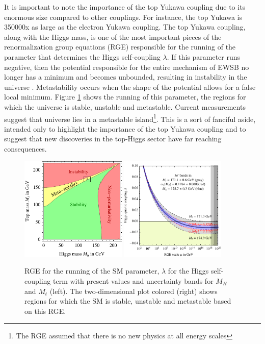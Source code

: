It is important to note the importance of the top Yukawa coupling
due to its enormous size compared to other couplings. For instance, the top Yukawa is 350000x as large as the electron
Yukawa coupling. The top Yukawa coupling,
along with the Higgs mass, is one of the most important pieces of the renormalization group equations (RGE)
responsible for the running of the parameter that determines the Higgs self-coupling $\lambda$. 
If this parameter runs negative, then the potential responsible for the entire mechanism 
of EWSB no longer has a minimum and becomes unbounded, resulting in instability in the universe \cite{Degrassi:2012ry}.
Metastability occurs when the shape of the potential allows for a false local minimum.
Figure \ref{figure:theory_stability} shows the running of this parameter, the regions
for which the universe is stable, unstable and metastable. Current
measurements suggest that universe lies in a metastable island\footnote{The
RGE assumed that there is no new physics at all energy scales}. This is a sort of fanciful
aside, intended only to highlight the importance of the top Yukawa coupling and to suggest that
new discoveries in the top-Higgs sector have far reaching consequences. 


\begin{figure}[!t]
\centering 
\includegraphics[width=0.45\textwidth]{figs/theory/SMstability.pdf}
\includegraphics[width=0.45\textwidth]{figs/theory/runLambda.pdf}
\caption {
  RGE for the running of the SM parameter, $\lambda$ for the Higgs self-coupling term 
  with present values and uncertainty bands for $M_H$ and $M_t$ (left). The two-dimensional
  plot colored (right) shows regions for which the SM is stable, unstable and metastable
  based on this RGE.}

\label{figure:theory_stability}

\end{figure}


